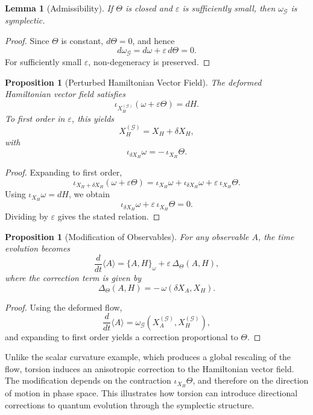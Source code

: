 \documentclass[11pt, a4paper]{article}
\newtheorem{lemma}[theorem]{Lemma}
\newtheorem{proposition}[theorem]{Proposition}
\begin{document}
\begin{lemma}[Admissibility]
If $\Theta$ is closed and $\varepsilon$ is sufficiently small, then
$\omega_{\mathcal{G}}$ is symplectic.
\end{lemma}

\begin{proof}
Since $\Theta$ is constant, $d\Theta = 0$, and hence
\[
d\omega_{\mathcal{G}} = d\omega + \varepsilon\, d\Theta = 0.
\]
For sufficiently small $\varepsilon$, non-degeneracy is preserved.
\end{proof}

\begin{proposition}[Perturbed Hamiltonian Vector Field]
The deformed Hamiltonian vector field satisfies
\[
\iota_{X_H^{(\mathcal{G})}}(\omega + \varepsilon \Theta) = dH.
\]
To first order in $\varepsilon$, this yields
\[
X_H^{(\mathcal{G})} = X_H + \delta X_H,
\]
with
\[
\iota_{\delta X_H}\omega = -\,\iota_{X_H}\Theta.
\]
\end{proposition}

\begin{proof}
Expanding to first order,
\[
\iota_{X_H + \delta X_H}(\omega + \varepsilon \Theta)
= \iota_{X_H}\omega + \iota_{\delta X_H}\omega
+ \varepsilon\,\iota_{X_H}\Theta.
\]
Using $\iota_{X_H}\omega = dH$, we obtain
\[
\iota_{\delta X_H}\omega + \varepsilon\,\iota_{X_H}\Theta = 0.
\]
Dividing by $\varepsilon$ gives the stated relation.
\end{proof}

\begin{proposition}[Modification of Observables]
For any observable $A$, the time evolution becomes
\[
\frac{d}{dt}\langle A \rangle
= \{A,H\}_{\omega}
+ \varepsilon\, \Delta_{\Theta}(A,H),
\]
where the correction term is given by
\[
\Delta_{\Theta}(A,H)
= -\,\omega(\delta X_A, X_H).
\]
\end{proposition}

\begin{proof}
Using the deformed flow,
\[
\frac{d}{dt}\langle A \rangle
= \omega_{\mathcal{G}}(X_A^{(\mathcal{G})}, X_H^{(\mathcal{G})}),
\]
and expanding to first order yields a correction proportional to $\Theta$.
\end{proof}

Unlike the scalar curvature example, which produces a global rescaling
of the flow, torsion induces an anisotropic correction to the Hamiltonian
vector field. The modification depends on the contraction
$\iota_{X_H}\Theta$, and therefore on the direction of motion in phase space.
This illustrates how torsion can introduce directional corrections to
quantum evolution through the symplectic structure.
\end{document}
